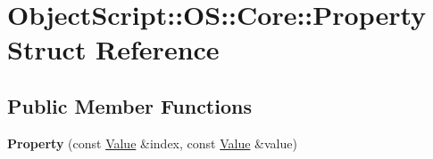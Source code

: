 \hypertarget{struct_object_script_1_1_o_s_1_1_core_1_1_property}{}\section{Object\+Script\+:\+:OS\+:\+:Core\+:\+:Property Struct Reference}
\label{struct_object_script_1_1_o_s_1_1_core_1_1_property}
\subsection*{Public Member Functions}
\begin{DoxyCompactItemize}
\item 
{\bfseries Property} (const \hyperlink{struct_object_script_1_1_o_s_1_1_core_1_1_value}{Value} \&index, const \hyperlink{struct_object_script_1_1_o_s_1_1_core_1_1_value}{Value} \&value)\hypertarget{struct_object_script_1_1_o_s_1_1_core_1_1_property_abe0bfec1247fbac4de77af63e9587879}{}\label{struct_object_script_1_1_o_s_1_1_core_1_1_property_abe0bfec1247fbac4de77af63e9587879}

\end{DoxyCompactItemize}
